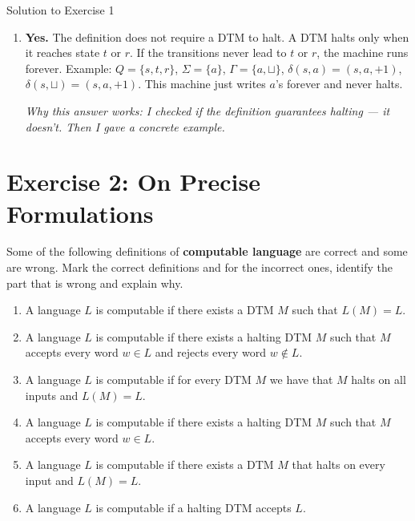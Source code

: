 \documentclass[11pt,a4paper]{article}
\newcommand{\blank}{\sqcup}
\begin{document}
\begin{solutionbox}{Solution to Exercise 1}
\begin{enumerate}
    \textit{Why this answer works: I checked if the definition imposes any restriction on the output matching the input --- it doesn't.}

    \item \textbf{Yes.} The definition does not require a DTM to halt. A DTM halts only when it reaches state $t$ or $r$. If the transitions never lead to $t$ or $r$, the machine runs forever. Example: $Q = \{s, t, r\}$, $\Sigma = \{a\}$, $\Gamma = \{a, \blank\}$, $\delta(s, a) = (s, a, +1)$, $\delta(s, \blank) = (s, a, +1)$. This machine just writes $a$'s forever and never halts.

    \textit{Why this answer works: I checked if the definition guarantees halting --- it doesn't. Then I gave a concrete example.}
\end{enumerate}
\end{solutionbox}

\newpage

\section*{Exercise 2: On Precise Formulations}

Some of the following definitions of \textbf{computable language} are correct and some are wrong. Mark the correct definitions and for the incorrect ones, identify the part that is wrong and explain why.

\begin{enumerate}
    \item A language $L$ is computable if there exists a DTM $M$ such that $L(M) = L$.

    \item A language $L$ is computable if there exists a halting DTM $M$ such that $M$ accepts every word $w \in L$ and rejects every word $w \notin L$.

    \item A language $L$ is computable if for every DTM $M$ we have that $M$ halts on all inputs and $L(M) = L$.

    \item A language $L$ is computable if there exists a halting DTM $M$ such that $M$ accepts every word $w \in L$.

    \item A language $L$ is computable if there exists a DTM $M$ that halts on every input and $L(M) = L$.

    \item A language $L$ is computable if a halting DTM accepts $L$.
\end{enumerate}
\end{document}
